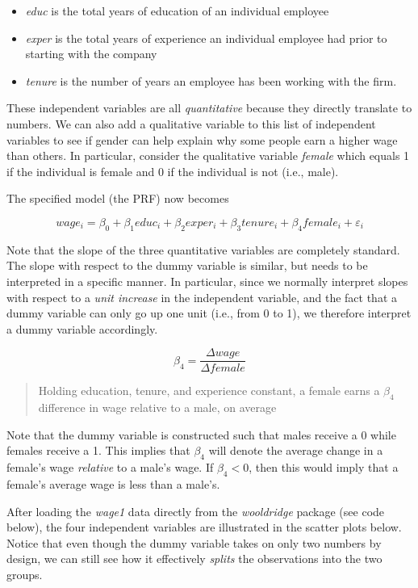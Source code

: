 \documentclass[
]{book}
\begin{document}
\begin{itemize}
\item
  \emph{educ} is the total years of education of an individual employee
\item
  \emph{exper} is the total years of experience an individual employee had prior to starting with the company
\item
  \emph{tenure} is the number of years an employee has been working with the firm.
\end{itemize}

These independent variables are all \emph{quantitative} because they directly translate to numbers. We can also add a qualitative variable to this list of independent variables to see if gender can help explain why some people earn a higher wage than others. In particular, consider the qualitative variable \emph{female} which equals 1 if the individual is female and 0 if the individual is not (i.e., male).

The specified model (the PRF) now becomes

\[wage_i=\beta_0+\beta_1educ_i+\beta_2exper_i+\beta_3tenure_i+\beta_4female_i+\varepsilon_i\]

Note that the slope of the three quantitative variables are completely standard. The slope with respect to the dummy variable is similar, but needs to be interpreted in a specific manner. In particular, since we normally interpret slopes with respect to a \emph{unit increase} in the independent variable, and the fact that a dummy variable can only go up one unit (i.e., from 0 to 1), we therefore interpret a dummy variable accordingly.

\[\beta_4 = \frac{\Delta wage}{\Delta female}\]

\begin{quote}
Holding education, tenure, and experience constant, a female earns a \(\beta_4\) difference in wage relative to a male, on average
\end{quote}

Note that the dummy variable is constructed such that males receive a 0 while females receive a 1. This implies that \(\beta_4\) will denote the average change in a female's wage \emph{relative} to a male's wage. If \(\beta_4 < 0\), then this would imply that a female's average wage is less than a male's.

After loading the \emph{wage1} data directly from the \emph{wooldridge} package (see code below), the four independent variables are illustrated in the scatter plots below. Notice that even though the dummy variable takes on only two numbers by design, we can still see how it effectively \emph{splits} the observations into the two groups.
\end{document}
